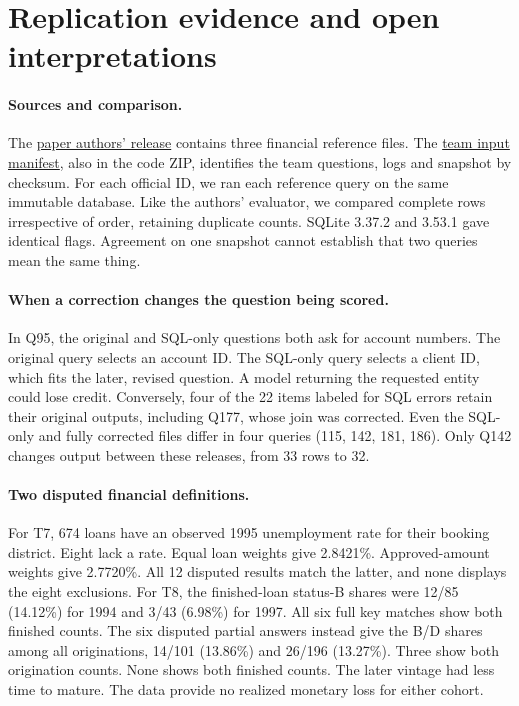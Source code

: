 \section{Replication evidence and open interpretations}
\label{sec:repdetails}

\paragraph{Sources and comparison.}
The \href{https://github.com/niklaswretblad/the-effects-of-noise-in-text-to-SQL/tree/6930cf6f9abaf50a3407f96b9facbda11835eec2}{paper authors' release} contains three financial reference files. The \href{https://github.com/LiangSihan0926/orie5255-group3-text-to-sql-mrm/blob/main/archive/manifest.json}{team input manifest}, also in the code ZIP, identifies the team questions, logs and snapshot by checksum. For each official ID, we ran each reference query on the same immutable database. Like the authors' evaluator, we compared complete rows irrespective of order, retaining duplicate counts. SQLite 3.37.2 and 3.53.1 gave identical flags. Agreement on one snapshot cannot establish that two queries mean the same thing.

\paragraph{When a correction changes the question being scored.}
In Q95, the original and SQL-only questions both ask for account numbers. The original query selects an account ID. The SQL-only query selects a client ID, which fits the later, revised question. A model returning the requested entity could lose credit. Conversely, four of the 22 items labeled for SQL errors retain their original outputs, including Q177, whose join was corrected. Even the SQL-only and fully corrected files differ in four queries (115, 142, 181, 186). Only Q142 changes output between these releases, from 33 rows to 32.

\paragraph{Two disputed financial definitions.}
For T7, 674 loans have an observed 1995 unemployment rate for their booking district. Eight lack a rate. Equal loan weights give 2.8421\%. Approved-amount weights give 2.7720\%. All 12 disputed results match the latter, and none displays the eight exclusions. For T8, the finished-loan status-B shares were 12/85 (14.12\%) for 1994 and 3/43 (6.98\%) for 1997. All six full key matches show both finished counts. The six disputed partial answers instead give the B/D shares among all originations, 14/101 (13.86\%) and 26/196 (13.27\%). Three show both origination counts. None shows both finished counts. The later vintage had less time to mature. The data provide no realized monetary loss for either cohort.


